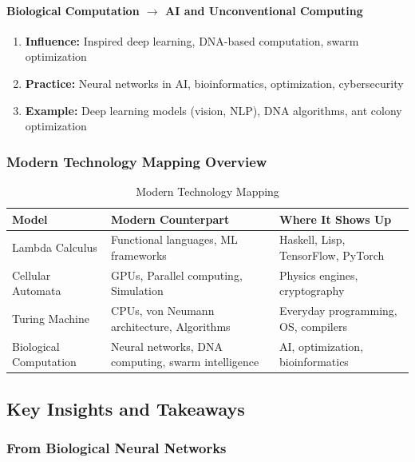 \paragraph{Biological Computation $\rightarrow$ AI and Unconventional Computing}
\label{para:biological-to-ai}

\begin{enumerate}
\item \textbf{Influence:} Inspired deep learning, DNA-based computation, swarm optimization
\item \textbf{Practice:} Neural networks in AI, bioinformatics, optimization, cybersecurity
\item \textbf{Example:} Deep learning models (vision, NLP), DNA algorithms, ant colony optimization
\end{enumerate}

\subsubsection{Modern Technology Mapping Overview}
\label{subsubsec:modern-tech-mapping}

\begin{table}[h!]
\centering
\begin{tabular}{|p{3cm}|p{4cm}|p{5cm}|}
\hline
\textbf{Model} & \textbf{Modern Counterpart} & \textbf{Where It Shows Up} \\
\hline
Lambda Calculus & Functional languages, ML frameworks & Haskell, Lisp, TensorFlow, PyTorch \\
\hline
Cellular Automata & GPUs, Parallel computing, Simulation & Physics engines, cryptography \\
\hline
Turing Machine & CPUs, von Neumann architecture, Algorithms & Everyday programming, OS, compilers \\
\hline
Biological Computation & Neural networks, DNA computing, swarm intelligence & AI, optimization, bioinformatics \\
\hline
\end{tabular}
\caption{Modern Technology Mapping}
\label{tab:modern-tech-mapping}
\end{table}

\subsection{Key Insights and Takeaways}
\label{subsec:key-insights-computation}

\subsubsection{From Biological Neural Networks}
\label{subsubsec:insights-biological-nn}

